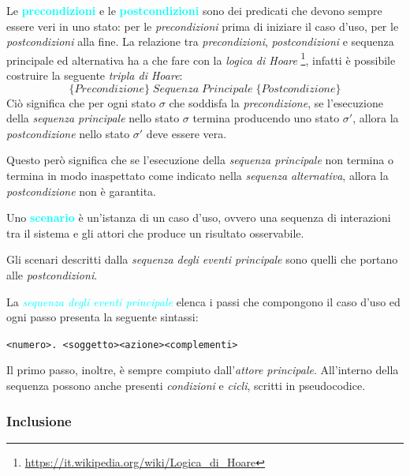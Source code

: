 \begin{definition}
    Le \textbf{\textcolor{cyan}{precondizioni}} e le \textbf{\textcolor{cyan}{postcondizioni}} sono
    dei predicati che devono sempre essere veri in uno stato: per le \emph{precondizioni} prima di iniziare il caso d'uso,
    per le \emph{postcondizioni} alla fine. La relazione tra \emph{precondizioni}, \emph{postcondizioni} e
    sequenza principale ed alternativa ha a che fare con la \emph{logica di Hoare} \footnote{\url{https://it.wikipedia.org/wiki/Logica_di_Hoare}},
    infatti è possibile costruire la seguente \emph{tripla di Hoare}:
    \[
        \{Precondizione\} \; Sequenza \; Principale \; \{Postcondizione\}
    \]
    Ciò significa che per ogni stato $\sigma$ che soddisfa la \emph{precondizione}, se l'esecuzione della
    \emph{sequenza principale} nello stato $\sigma$ termina producendo uno stato $\sigma'$, allora la \emph{postcondizione}
    nello stato $\sigma'$ deve essere vera.

    Questo però significa che se l'esecuzione della \emph{sequenza principale} non termina o termina in modo inaspettato come indicato
    nella \emph{sequenza alternativa}, allora la \emph{postcondizione} non è garantita.
\end{definition}

\begin{definition}[Scenario]
    Uno \textbf{\textcolor{cyan}{scenario}} è un'istanza di un caso d'uso, ovvero una sequenza 
    di interazioni tra il sistema e gli attori che produce un risultato osservabile.

    Gli scenari descritti dalla \emph{sequenza degli eventi principale} sono quelli che portano
    alle \emph{postcondizioni}.
\end{definition}

La \emph{\textcolor{cyan}{sequenza degli eventi principale}} elenca i passi che compongono il caso d'uso ed ogni passo presenta la
seguente sintassi:
\begin{center}
    \verb|<numero>. <soggetto><azione><complementi>|
\end{center}
Il primo passo, inoltre, è sempre compiuto dall'\emph{attore principale}.
All'interno della sequenza possono anche presenti \emph{condizioni} e \emph{cicli}, scritti in pseudocodice.

\subsubsection{Inclusione}

